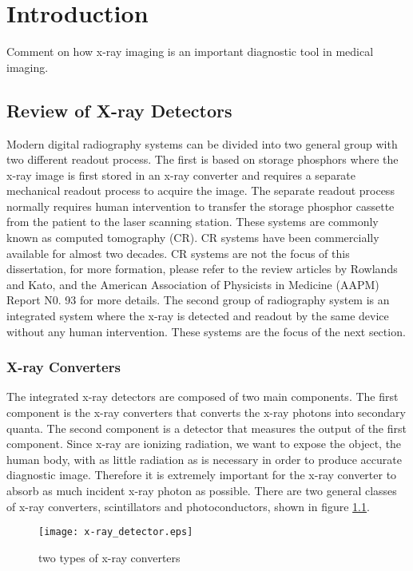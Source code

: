 \chapter{Introduction}
\label{chap:intro}

Comment on how x-ray imaging is an important diagnostic tool in medical imaging.  

\section{Review of X-ray Detectors}
Modern digital radiography systems can be divided into two general group with two different readout process.  The first is based on storage phosphors where the x-ray image is first stored in an x-ray converter and requires a separate mechanical readout process to acquire the image.  The separate readout process normally requires human intervention to transfer the storage phosphor cassette from the patient to the laser scanning station.  These systems are commonly known as computed tomography (CR).  CR systems have been commercially available for almost two decades.  CR systems are not the focus of this dissertation, for more formation, please refer to the review articles by Rowlands\cite{Rowlands2002} and Kato\cite{kato1994}, and the American Association of Physicists in Medicine (AAPM) Report N0. 93 for more details\cite{AAPM93}. The second group of radiography system is an integrated system where the x-ray is detected and readout by the same device without any human intervention.  These systems are the focus of the next section.

\subsection{X-ray Converters}
The integrated x-ray detectors are composed of two main components.  The first component is the x-ray converters that converts the x-ray photons into secondary quanta.  The second component is a detector that measures the output of the first component.  Since x-ray are ionizing radiation, we want to expose the object, the human body, with as little radiation as is necessary in order to produce accurate diagnostic image.  Therefore it is extremely important for the x-ray converter to absorb as much incident x-ray photon as possible.  There are two general classes of x-ray converters, scintillators and photoconductors, shown in figure \ref{fig:x-ray_detector}.


\begin{figure}
\centering
\texttt{[image: x-ray\_detector.eps]}
\label{fig:x-ray_detector}
\caption{two types of x-ray converters}
\end{figure}


